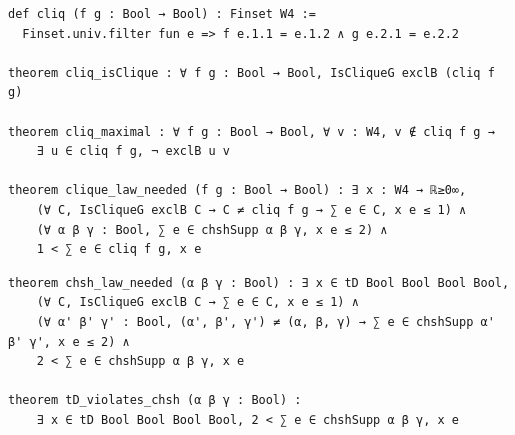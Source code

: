 \label{lean:clique-law-needed}
\begin{lstlisting}
def cliq (f g : Bool → Bool) : Finset W4 :=
  Finset.univ.filter fun e => f e.1.1 = e.1.2 ∧ g e.2.1 = e.2.2

theorem cliq_isClique : ∀ f g : Bool → Bool, IsCliqueG exclB (cliq f g)

theorem cliq_maximal : ∀ f g : Bool → Bool, ∀ v : W4, v ∉ cliq f g →
    ∃ u ∈ cliq f g, ¬ exclB u v

theorem clique_law_needed (f g : Bool → Bool) : ∃ x : W4 → ℝ≥0∞,
    (∀ C, IsCliqueG exclB C → C ≠ cliq f g → ∑ e ∈ C, x e ≤ 1) ∧
    (∀ α β γ : Bool, ∑ e ∈ chshSupp α β γ, x e ≤ 2) ∧
    1 < ∑ e ∈ cliq f g, x e
\end{lstlisting}

\label{lean:chsh-law-needed}
\begin{lstlisting}
theorem chsh_law_needed (α β γ : Bool) : ∃ x ∈ tD Bool Bool Bool Bool,
    (∀ C, IsCliqueG exclB C → ∑ e ∈ C, x e ≤ 1) ∧
    (∀ α' β' γ' : Bool, (α', β', γ') ≠ (α, β, γ) → ∑ e ∈ chshSupp α' β' γ', x e ≤ 2) ∧
    2 < ∑ e ∈ chshSupp α β γ, x e

theorem tD_violates_chsh (α β γ : Bool) :
    ∃ x ∈ tD Bool Bool Bool Bool, 2 < ∑ e ∈ chshSupp α β γ, x e
\end{lstlisting}
